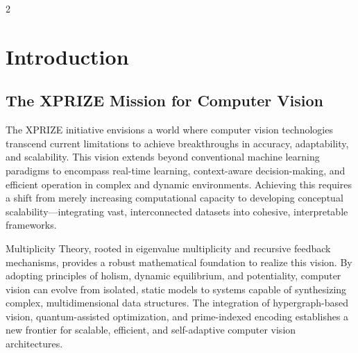 \documentclass{article}
\theoremstyle{plain}
\begin{document}
\newpage
\begin{multicols}{2}
\begin{singlespace}
\tableofcontents
\end{singlespace}
\end{multicols}

\section{Introduction}
\subsection{The XPRIZE Mission for Computer Vision}
The XPRIZE initiative envisions a world where computer vision technologies transcend current limitations to achieve breakthroughs in accuracy, adaptability, and scalability. This vision extends beyond conventional machine learning paradigms to encompass real-time learning, context-aware decision-making, and efficient operation in complex and dynamic environments. Achieving this requires a shift from merely increasing computational capacity to developing conceptual scalability—integrating vast, interconnected datasets into cohesive, interpretable frameworks.

Multiplicity Theory, rooted in eigenvalue multiplicity and recursive feedback mechanisms, provides a robust mathematical foundation to realize this vision. By adopting principles of holism, dynamic equilibrium, and potentiality, computer vision can evolve from isolated, static models to systems capable of synthesizing complex, multidimensional data structures. The integration of hypergraph-based vision, quantum-assisted optimization, and prime-indexed encoding establishes a new frontier for scalable, efficient, and self-adaptive computer vision architectures.
\end{document}
